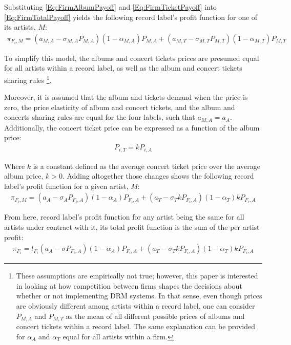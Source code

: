 \documentclass[a4paper,12pt]{article}
\numberwithin{equation}{section}
\begin{document}
Substituting \eqref{Eq:FirmAlbumPayoff} and \eqref{Eq:FirmTicketPayoff} into \eqref{Eq:FirmTotalPayoff} yields the following record label’s profit function for one of its artists, $M$:
\begin{eqnarray}
\pi_{F_i, M} = (a_{M, A} - \sigma_{M, A} P_{M, A})(1 - \alpha_{M, A}) P_{M, A} +
	(a_{M, T} - \sigma_{M, T} P_{M, T})(1 - \alpha_{M, T}) P_{M, T}
\end{eqnarray}

To simplify this model, the albums and concert tickets prices are presumed equal for all artists within a record label, as well as the album and concert tickets sharing rules \footnote{
These assumptions are empirically not true; however, this paper is interested in looking at how competition between firms shapes the decisions about whether or not implementing DRM systems. In that sense, even though prices are obviously different among artists within a record label, one can consider $P_{M, A}$ and $P_{M, T}$ as the mean of all different possible prices of albums and concert tickets within a record label. The same explanation can be provided for $\alpha_A$ and $\alpha_T$ equal for all artists within a firm.
}.

Moreover, it is assumed that the album and tickets demand when the price is zero, the price elasticity of album and concert tickets, and the album and concerts sharing rules are equal for the four labels, such that $a_{M, A} = a_A$. Additionally, the concert ticket price can be expressed as a function of the album price:
\begin{eqnarray*}
P_{i, T} = k P_{i, A}
\end{eqnarray*}

Where $k$ is a constant defined as the average concert ticket price over the average album price, $k > 0$. Adding altogether those changes shows the following record label’s profit function for a given artist, $M$:
\begin{eqnarray}
\pi_{F_i, M} = (a_A - \sigma_A P_{F_i, A})(1 - \alpha_A) P_{F_i, A} +
	(a_T - \sigma_T k P_{F_i, A}) (1 - \alpha_T) k P_{F_i, A}
\end{eqnarray}

From here, record label’s profit function for any artist being the same for all artists under contract with it, its total profit function is the sum of the per artist profit:
\begin{eqnarray}
\pi_{F_i} = l_{F_i} (a_A - \sigma P_{F_i, A})(1 - \alpha_A) P_{F_i, A} +
	(a_T - \sigma_T k P_{F_i, A})(1 - \alpha_T) k P_{F_i, A}
\end{eqnarray}
\end{document}

